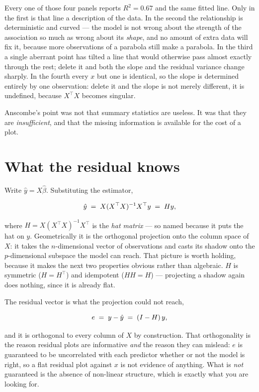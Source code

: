 \documentclass[
  letterpaper,
  10pt,
  twoside,
  openright,
  numbers=noenddot,
  chapterprefix=true]{scrbook}
\begin{document}
Every one of those four panels reports \(R^2 = 0.67\) and the same
fitted line. Only in the first is that line a description of the data.
In the second the relationship is deterministic and curved --- the model
is not wrong about the strength of the association so much as wrong
about its \emph{shape}, and no amount of extra data will fix it, because
more observations of a parabola still make a parabola. In the third a
single aberrant point has tilted a line that would otherwise pass almost
exactly through the rest; delete it and both the slope and the residual
variance change sharply. In the fourth every \(x\) but one is identical,
so the slope is determined entirely by one observation: delete it and
the slope is not merely different, it is undefined, because
\(X^{\top}X\) becomes singular.

Anscombe's point was not that summary statistics are useless. It was
that they are \emph{insufficient}, and that the missing information is
available for the cost of a plot.

\section{What the residual knows}\label{what-the-residual-knows}

Write \(\hat y = X\hat\beta\). Substituting the estimator,

\[
\hat y \thickspace=\thickspace X(X^{\top}X)^{-1}X^{\top} y \thickspace=\thickspace Hy ,
\]

where \(H = X(X^{\top}X)^{-1}X^{\top}\) is the \emph{hat matrix} --- so
named because it puts the hat on \(y\). Geometrically it is the
orthogonal projection onto the column space of \(X\): it takes the
\(n\)-dimensional vector of observations and casts its shadow onto the
\(p\)-dimensional subspace the model can reach. That picture is worth
holding, because it makes the next two properties obvious rather than
algebraic. \(H\) is symmetric (\(H = H^{\top}\)) and idempotent
(\(HH = H\)) --- projecting a shadow again does nothing, since it is
already flat.

The residual vector is what the projection could not reach,

\[
e \thickspace=\thickspace y - \hat y \thickspace=\thickspace (I - H)\thinspace y ,
\]

and it is orthogonal to every column of \(X\) by construction. That
orthogonality is the reason residual plots are informative \emph{and}
the reason they can mislead: \(e\) is guaranteed to be uncorrelated with
each predictor whether or not the model is right, so a flat residual
plot against \(x\) is not evidence of anything. What is \emph{not}
guaranteed is the absence of non-linear structure, which is exactly what
you are looking for.
\end{document}
